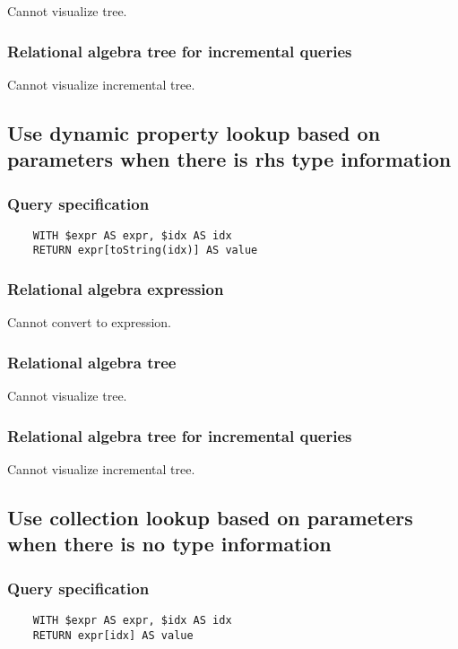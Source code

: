 	Cannot visualize tree.

	\subsubsection*{Relational algebra tree for incremental queries}

	Cannot visualize incremental tree.
	\subsection{Use dynamic property lookup based on parameters when there is rhs type information}

	\subsubsection*{Query specification}

	\begin{lstlisting}
	WITH $expr AS expr, $idx AS idx
	RETURN expr[toString(idx)] AS value
	\end{lstlisting}


	\subsubsection*{Relational algebra expression}

	Cannot convert to expression.

	\subsubsection*{Relational algebra tree}

	Cannot visualize tree.

	\subsubsection*{Relational algebra tree for incremental queries}

	Cannot visualize incremental tree.
	\subsection{Use collection lookup based on parameters when there is no type information}

	\subsubsection*{Query specification}

	\begin{lstlisting}
	WITH $expr AS expr, $idx AS idx
	RETURN expr[idx] AS value
	\end{lstlisting}


